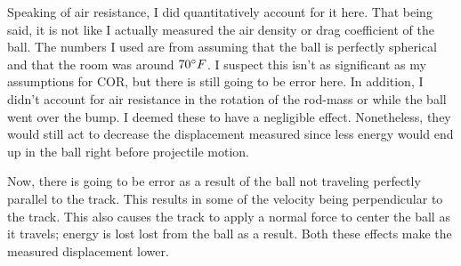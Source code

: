 \documentclass[12pt]{article} %
\begin{document}
Speaking of air resistance, I did quantitatively account for it here. That being said, it is not like I actually measured the air density or drag coefficient of the ball. The numbers I used are from assuming that the ball is perfectly spherical and that the room was around $70\degree F$. I suspect this isn't as significant as my assumptions for COR, but there is still going to be error here. In addition, I didn't account for air resistance in the rotation of the rod-mass or while the ball went over the bump. I deemed these to have a negligible effect. Nonetheless, they would still act to decrease the displacement measured since less energy would end up in the ball right before projectile motion.

Now, there is going to be error as a result of the ball not traveling perfectly parallel to the track. This results in some of the velocity being perpendicular to the track. This also causes the track to apply a normal force to center the ball as it travels; energy is lost lost from the ball as a result. Both these effects make the measured displacement lower.
\end{document}
